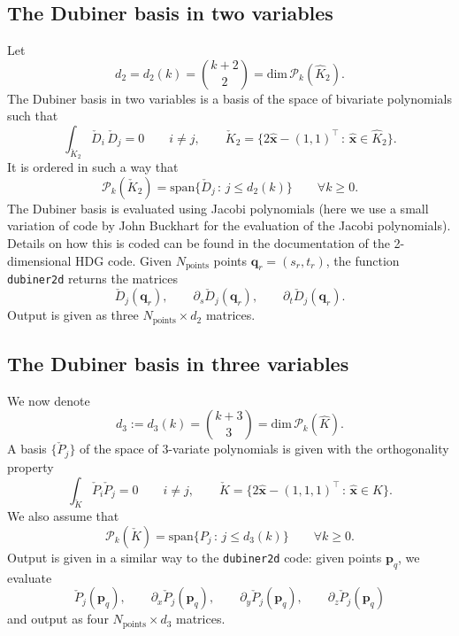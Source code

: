 \documentclass[10pt,english]{article}
\begin{document}
\subsection{The Dubiner basis in two variables}

Let
\[
d_2=d_2(k)={k+2 \choose 2}=\mathrm{dim}\,\mathcal P_k(\widehat K_2).
\]
The Dubiner basis in two variables is a basis of the space of bivariate polynomials such that
\[
\int_{\check K_2} \check D_i\,\check D_j=0 \qquad i\neq j, \qquad \check K_2=\{ 2 \widehat{\mathbf x}-(1,1)^\top\,:\, \widehat{\mathbf x}\in \widehat K_2\}.
\]
It is ordered in such a way that
\[
\mathcal P_k(\check K_2)=\mathrm{span}\{\check  D_j\,:\, j\le d_2(k)\} \qquad \forall k\ge 0.
\]
The Dubiner basis is evaluated using Jacobi polynomials (here we use a small variation of code by John Buckhart for the evaluation of the Jacobi polynomials). Details on how this is coded can be found in the documentation of the 2-dimensional HDG code. Given $N_{\mathrm{points}}$  points $\mathbf q_r=(s_r,t_r)$, the function {\tt dubiner2d} returns the matrices
\[
\check D_j(\mathbf q_r), \qquad \partial_{s} \check D_j(\mathbf q_r), \qquad \partial_{t} \check D_j(\mathbf q_r).
\]
Output is given as three $N_{\mathrm{points}}\times d_2$ matrices.





\subsection{The Dubiner basis in three variables}

We now denote
\[
d_3:=d_3(k)={k+3\choose 3}=\mathrm{dim}\,\mathcal P_k(\widehat K).
\]
A basis  $\{\check P_j\}$ of the space of 3-variate polynomials is given with the orthogonality property
\[
\int_{\check K}\check P_i\check P_j=0 \qquad i\neq j, \qquad \check K=\{ 2 \widehat{\mathbf x}-(1,1,1)^\top\,:\, \widehat{\mathbf x}\in \widehat K\}.
\]
We also assume that
\[
\mathcal P_k(\check K)=\mathrm{span}\{ P_j\,:\, j\le d_3(k)\} \qquad \forall k\ge 0.
\]
Output is given in a similar way to the {\tt dubiner2d} code: given points $\mathbf p_q$, we evaluate
\[
\check P_j(\mathbf p_q), \qquad \partial_x \check P_j(\mathbf p_q), \qquad \partial_y \check P_j(\mathbf p_q), \qquad \partial_z \check P_j(\mathbf p_q)
\]
and output as four $N_{\mathrm{points}}\times d_3$ matrices.



\end{document}
